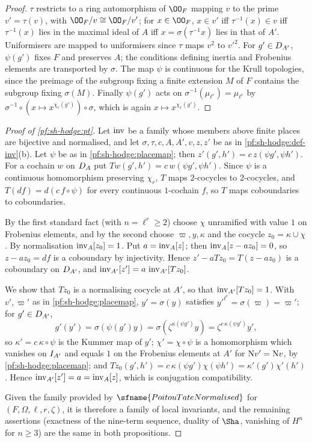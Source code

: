 \begin{proof}
$\tau$ restricts to a ring automorphism of $\OO_F$ mapping $v$ to the prime $v'=\tau(v)$, with $\OO_F/v\cong\OO_F/v'$; for
$x\in\OO_F$, $x\in v'$ iff $\tau^{-1}(x)\in v$ iff $\tau^{-1}(x)$ lies in the maximal ideal of $A$ iff $x=\sigma(\tau^{-1}x)$ lies in
that of $A'$. Uniformisers are mapped to uniformisers since $\tau$ maps $v^2$ to $v'^2$. For $g'\in D_{A'}$, $\psi(g')$ fixes
$F$ and preserves $A$; the conditions defining inertia and Frobenius elements are transported by $\sigma$. The map $\psi$ is continuous for the
Krull topologies, since the preimage of the subgroup fixing a finite extension $M$ of $F$ contains the subgroup fixing $\sigma(M)$. Finally
$\psi(g')$ acts on $\sigma^{-1}(\mu_{\ell^r})=\mu_{\ell^r}$ by $\sigma^{-1}\circ(x\mapsto x^{\chi_r(g')})\circ\sigma$, which is again
$x\mapsto x^{\chi_r(g')}$.
\end{proof}

\begin{proof}[Proof of \cref{pf:sh-hodge:pt}]
Let $\operatorname{inv}$ be a family whose members above finite places are bijective and normalised, and let
$\sigma,\tau,c,A,A',v,z,z'$ be as in \cref{pf:sh-hodge:def-inv}(b). Let $\psi$ be as in \cref{pf:sh-hodge:placemap}; then
$z'(g',h')=c\,z(\psi g',\psi h')$. For a cochain $w$ on $D_A$ put $Tw(g',h')=c\,w(\psi g',\psi h')$. Since $\psi$ is a
continuous homomorphism preserving $\chi_r$, $T$ maps $2$-cocycles to $2$-cocycles, and $T(df)=d(c\,f\circ\psi)$ for every continuous
$1$-cochain $f$, so $T$ maps coboundaries to coboundaries.

By the first standard fact (with $n=\ell^r\ge2$) choose $\chi$ unramified with value $1$ on Frobenius elements, and by the second
choose $\varpi,y,\kappa$ and the cocycle $z_0=\kappa\cup\chi$. By normalisation $\operatorname{inv}_A[z_0]=1$. Put
$a=\operatorname{inv}_A[z]$; then $\operatorname{inv}_A[z-az_0]=0$, so $z-az_0=df$ is a coboundary by injectivity. Hence
$z'-aTz_0=T(z-az_0)$ is a coboundary on $D_{A'}$, and $\operatorname{inv}_{A'}[z']=a\,\operatorname{inv}_{A'}[Tz_0]$.

We show that $Tz_0$ is a normalising cocycle at $A'$, so that $\operatorname{inv}_{A'}[Tz_0]=1$. With $v',\varpi'$ as in
\cref{pf:sh-hodge:placemap}, $y'=\sigma(y)$ satisfies $y'^{\ell^r}=\sigma(\varpi)=\varpi'$; for $g'\in D_{A'}$,
\[
g'(y')=\sigma(\psi(g')y)=\sigma(\zeta^{\kappa(\psi g')}y)=\zeta^{c\,\kappa(\psi g')}y',
\]
so $\kappa'=c\,\kappa\circ\psi$ is the Kummer map of $y'$; $\chi'=\chi\circ\psi$ is a homomorphism which vanishes on $I_{A'}$
and equals $1$ on the Frobenius elements at $A'$ for $\mathrm{N} v'=\mathrm{N} v$, by \cref{pf:sh-hodge:placemap}; and
$Tz_0(g',h')=c\,\kappa(\psi g')\chi(\psi h')=\kappa'(g')\chi'(h')$. Hence $\operatorname{inv}_{A'}[z']=a=\operatorname{inv}_A[z]$, which is conjugation
compatibility.

Given the family provided by $\sfname{PoitouTateNormalised}$ for $(F,\Omega,\ell,r,\zeta)$, it is therefore a family of local invariants,
and the remaining assertions (exactness of the nine-term sequence, duality of $\Sha$, vanishing of $H^n$ for $n\ge3$) are the same
in both propositions.
\end{proof}

